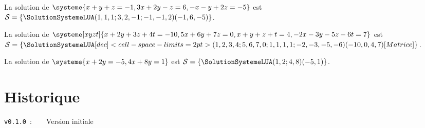 \documentclass[a4paper,11pt]{article}
\begin{document}
\begin{PresentationCode}{}
La solution de $\systeme{x+y+z=-1,3x+2y-z=6,-x-y+2z=-5}$ est $\mathcal{S}=%
\left\lbrace \SolutionSystemeLUA(1,1,1;3,2,-1;-1,-1,2)(-1,6,-5) \right\rbrace$.
\end{PresentationCode}

\begin{PresentationCode}{}
La solution de $\systeme[xyzt]{x+2y+3z+4t=-10,5x+6y+7z=0,x+y+z+t=4,-2x-3y-5z-6t=7}$
est $\mathcal{S}=%
\left\lbrace
	\SolutionSystemeLUA%
		[dec]<cell-space-limits=2pt>%
		(1,2,3,4;5,6,7,0;1,1,1,1;-2,-3,-5,-6)(-10,0,4,7)%
		[Matrice]
\right\rbrace$.
\end{PresentationCode}

\begin{PresentationCode}{}
La solution de $\systeme{x+2y=-5,4x+8y=1}$ est $\mathcal{S}=%
\left\lbrace \SolutionSystemeLUA(1,2;4,8)(-5,1) \right\rbrace$.
\end{PresentationCode}

\pagebreak

\part{Historique}

\verb|v0.1.0|~:~~~~Version initiale
\end{document}

